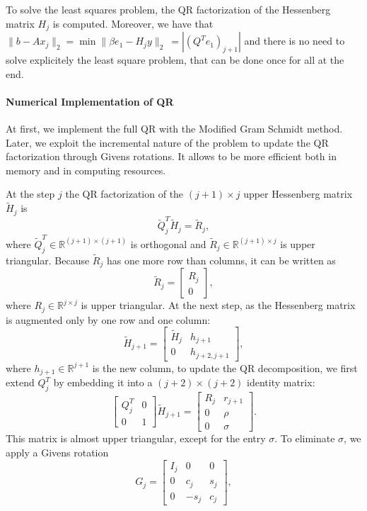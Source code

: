 \documentclass[hidelinks]{article}
\begin{document}
To solve the least squares problem, the QR factorization of the Hessenberg matrix $H_j$ is computed. Moreover, we have that $ \| b - Ax_j \|_2 = \min \| \beta e_1 - H_j y \|_2 \ = |(Q^Te_1)_{j+1}|$ and there is no need to solve explicitely the least square problem, that can be done once for all at the end.

\paragraph{Numerical Implementation of QR}
At first, we implement the full QR with the Modified Gram Schmidt method. Later, we exploit the incremental nature of the problem to update the QR factorization through Givens rotations. It allows to be more efficient both in memory and in computing resources.

At the step $j$ the QR factorization of the \((j+1) \times j\) upper Hessenberg matrix \( \widetilde{H}_j \) is
\[
\widetilde{Q}^T_j \widetilde{H}_j = \widetilde{R}_j,
\]
where \( \widetilde{Q}^T_j \in \mathbb{R}^{(j+1) \times (j+1)} \) is orthogonal and \( \widetilde{R}_j \in \mathbb{R}^{(j+1) \times j} \) is upper triangular. Because \( \widetilde{R}_j \) has one more row than columns, it can be written as
\[
\widetilde{R}_j = 
\begin{bmatrix}
R_j \\
0
\end{bmatrix},
\]
where \( R_j \in \mathbb{R}^{j \times j} \) is upper triangular.
At the next step, as the Hessenberg matrix is augmented only by one row and one column:
\[
\widetilde{H}_{j+1} = 
\begin{bmatrix}
\widetilde{H}_j & h_{j+1} \\
0 & h_{j+2,j+1}
\end{bmatrix},
\]
where \( h_{j+1} \in \mathbb{R}^{j+1} \) is the new column, to update the QR decomposition, we first extend \( Q^T_j \) by embedding it into a \((j+2) \times (j+2)\) identity matrix:
\[
\begin{bmatrix}
Q^T_j & 0 \\
0 & 1
\end{bmatrix} \widetilde{H}_{j+1} =
\begin{bmatrix}
R_j & r_{j+1} \\
0 & \rho \\
0 & \sigma
\end{bmatrix}.
\]
This matrix is almost upper triangular, except for the entry \( \sigma \). To eliminate \( \sigma \), we apply a Givens rotation
\[
G_j = 
\begin{bmatrix}
I_j & 0 & 0 \\
0 & c_j & s_j \\
0 & -s_j & c_j
\end{bmatrix},
\]
\end{document}
